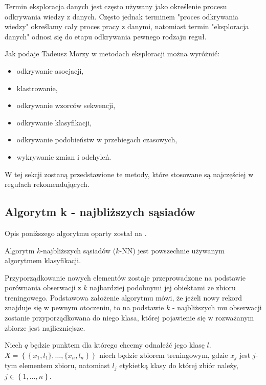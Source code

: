 \documentclass[12pt,a4paper]{report}
\newcommand{\set}[1]{\left\lbrace {#1} \right\rbrace}
\begin{document}
Termin eksploracja danych jest często używany jako określenie procesu odkrywania wiedzy z danych. Często jednak terminem  "proces odkrywania wiedzy" określamy cały proces pracy z danymi, natomiast termin "eksploracja danych" odnosi się do etapu odkrywania pewnego rodzaju reguł.

Jak podaje Tadeusz Morzy \citep{edmia} w metodach eksploracji można wyróżnić:
\begin{itemize}
\item odkrywanie asocjacji,
\item klastrowanie,
\item odkrywanie wzorców sekwencji,
\item odkrywanie klasyfikacji,
\item odkrywanie podobieństw w przebiegach czasowych,
\item wykrywanie zmian i odchyleń.
\end{itemize}

W tej sekcji zostaną przedstawione te metody, które stosowane są najczęściej w regułach rekomendujących.


\subsection{Algorytm k - najbliższych sąsiadów }
Opis poniższego algorytmu oparty został na {\citep[Sec 2.3.1]{rsh}}.

Algorytm $k$-najbliższych sąsiadów ($k$-NN) jest powszechnie używanym algorytmem klasyfikacji.
 
Przyporządkowanie nowych elementów zostaje przeprowadzone na podstawie porównania obserwacji z $k$ najbardziej podobnymi jej obiektami ze zbioru treningowego. Podstawowa założenie algorytmu mówi, że jeżeli nowy rekord znajduje się w pewnym otoczeniu, to na podstawie $k$ - najbliższych mu obserwacji zostanie przyporządkowana do niego klasa, której pojawienie się w rozważanym zbiorze jest najliczniejsze.

Niech $q$ będzie punktem dla którego chcemy odnaleźć jego klasę $l$. 
\\$\mathit{X}=\set{\set{x_1,l_1\},\ldots,\{x_n,l_n}}$ niech będzie zbiorem treningowym, gdzie $x_j$ jest $j$-tym elementem zbioru, natomiast $l_j$ etykietką klasy do której zbiór należy, $j\in\set{1,\ldots,n}$.
\end{document}
